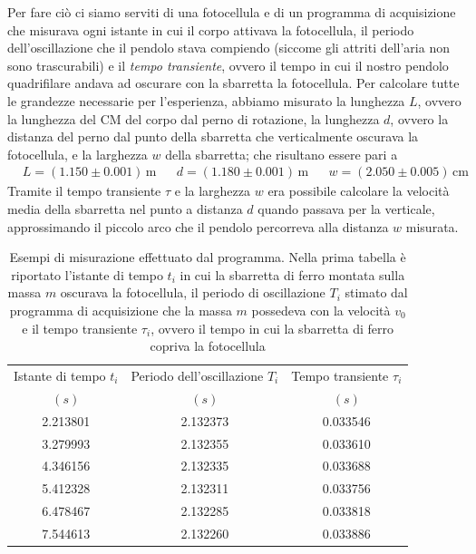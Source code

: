 \documentclass{article}
\begin{document}
	Per fare ciò ci siamo serviti di una fotocellula e di un programma di acquisizione che misurava ogni istante in cui il corpo attivava la fotocellula, il periodo dell'oscillazione che il pendolo stava compiendo (siccome gli attriti dell'aria non sono trascurabili) e il \emph{tempo transiente}, ovvero il tempo in cui il nostro pendolo quadrifilare andava ad oscurare con la sbarretta la fotocellula. Per calcolare tutte le grandezze necessarie per l'esperienza, abbiamo misurato la lunghezza $L$, ovvero la lunghezza del CM del corpo dal perno di rotazione, la lunghezza $d$, ovvero la distanza del perno dal punto della sbarretta che verticalmente oscurava la fotocellula, e la larghezza $w$ della sbarretta; che risultano essere pari a
\begin{align*}
	&L = (1.150 \pm 0.001) \, \si{\meter} & &d = (1.180 \pm 0.001) \, \si{\meter} & &w = (2.050 \pm 0.005) \, \si{\centi\meter}
\end{align*}
Tramite il tempo transiente $\tau$ e la larghezza $w$ era possibile calcolare la velocità media della sbarretta nel punto a distanza $d$ quando passava per la verticale, approssimando il piccolo arco che il pendolo percorreva alla distanza $w$ misurata. 

\begin{table}[H]
\centering
\begin{tabular}{c c c}
Istante di tempo $t_i$ & Periodo dell'oscillazione $T_i$ & Tempo transiente $\tau_i$ \\ 
$(s)$ & $(s)$ & $(s)$ \\ \toprule
2.213801	 & 2.132373 & 0.033546 \\
3.279993	 & 2.132355 & 0.033610 \\
4.346156 & 2.132335	& 0.033688 \\
5.412328	 & 2.132311	& 0.033756 \\
6.478467	 & 2.132285	& 0.033818 \\
7.544613	 & 2.132260	& 0.033886 \\ \bottomrule
\end{tabular}
\caption{Esempi di misurazione effettuato dal programma. Nella prima tabella è riportato l'istante di tempo $t_i$ in cui la sbarretta di ferro montata sulla massa $m$ oscurava la fotocellula, il periodo di oscillazione $T_i$ stimato dal programma di acquisizione che la massa $m$ possedeva con la velocità $v_0$ e il tempo transiente $\tau_i$, ovvero il tempo in cui la sbarretta di ferro copriva la fotocellula}
\end{table}
\end{document}
